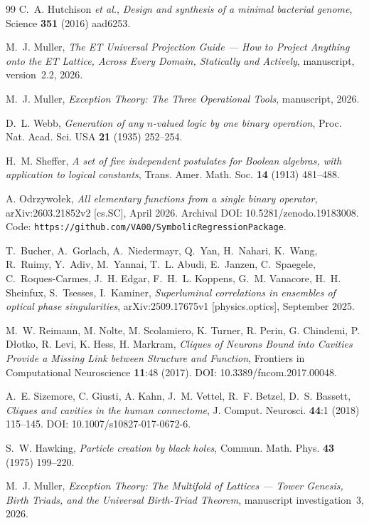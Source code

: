 \documentclass[11pt,a4paper]{article}
\theoremstyle{definition}
\theoremstyle{remark}
\begin{document}
\begin{thebibliography}{99}
C.~A. Hutchison \emph{et al.},
\emph{Design and synthesis of a minimal bacterial genome},
Science {\bf 351} (2016) aad6253.

M.~J. Muller,
\emph{The ET Universal Projection Guide --- How to Project Anything onto the ET Lattice, Across Every Domain, Statically and Actively}, manuscript, version~2.2, 2026.

M.~J. Muller,
\emph{Exception Theory: The Three Operational Tools}, manuscript, 2026.

D.~L. Webb,
\emph{Generation of any $n$-valued logic by one binary operation},
Proc. Nat. Acad. Sci. USA {\bf 21} (1935) 252--254.

H.~M. Sheffer,
\emph{A set of five independent postulates for Boolean algebras, with application to logical constants},
Trans. Amer. Math. Soc. {\bf 14} (1913) 481--488.

A. Odrzywo{\l}ek,
\emph{All elementary functions from a single binary operator},
arXiv:2603.21852v2 [cs.SC], April 2026.
Archival DOI: 10.5281/zenodo.19183008.
Code: \texttt{https://github.com/VA00/SymbolicRegressionPackage}.

T.~Bucher, A.~Gorlach, A.~Niedermayr, Q.~Yan, H.~Nahari, K.~Wang, R.~Ruimy,
Y.~Adiv, M.~Yannai, T.~L. Abudi, E.~Janzen, C.~Spaegele, C.~Roques-Carmes,
J.~H. Edgar, F.~H.~L. Koppens, G.~M. Vanacore, H.~H. Sheinfux, S.~Tsesses, I.~Kaminer,
\emph{Superluminal correlations in ensembles of optical phase singularities},
arXiv:2509.17675v1 [physics.optics], September 2025.

M.~W. Reimann, M. Nolte, M. Scolamiero, K. Turner, R. Perin, G. Chindemi, P. D{\l}otko, R. Levi, K. Hess, H. Markram,
\emph{Cliques of Neurons Bound into Cavities Provide a Missing Link between Structure and Function},
Frontiers in Computational Neuroscience {\bf 11}:48 (2017).
DOI: 10.3389/fncom.2017.00048.

A.~E. Sizemore, C. Giusti, A. Kahn, J.~M. Vettel, R.~F. Betzel, D.~S. Bassett,
\emph{Cliques and cavities in the human connectome},
J. Comput. Neurosci. {\bf 44}:1 (2018) 115--145.
DOI: 10.1007/s10827-017-0672-6.

S.~W. Hawking,
\emph{Particle creation by black holes},
Commun. Math. Phys. {\bf 43} (1975) 199--220.

M.~J. Muller,
\emph{Exception Theory: The Multifold of Lattices --- Tower Genesis, Birth Triads, and the Universal Birth-Triad Theorem}, manuscript investigation~3, 2026.


\end{thebibliography}
\end{document}
